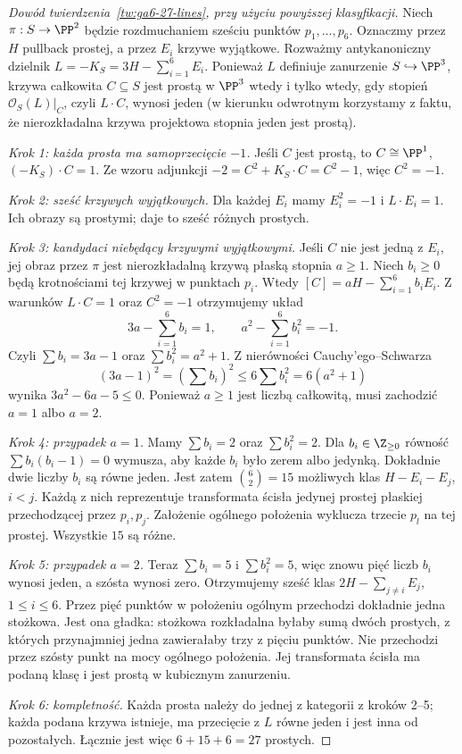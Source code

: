 \begin{proof}[Dowód twierdzenia~\ref{tw:ga6-27-lines}, przy użyciu powyższej klasyfikacji]
Niech $\pi:S\to\PP^2$ będzie rozdmuchaniem
sześciu punktów $p_1,\ldots,p_6$. Oznaczmy
przez $H$ pullback prostej, a przez $E_i$
krzywe wyjątkowe. Rozważmy antykanoniczny
dzielnik $L=-K_S=3H-\sum_{i=1}^6E_i$.
Ponieważ $L$ definiuje zanurzenie $S\hookrightarrow\PP^3$,
krzywa całkowita $C\subseteq S$ jest prostą
w $\PP^3$ wtedy i tylko wtedy, gdy stopień
$\mathcal O_S(L)|_C$, czyli $L\cdot C$, wynosi jeden
(w kierunku odwrotnym korzystamy z faktu, że
nierozkładalna krzywa projektowa stopnia jeden
jest prostą).

\emph{Krok 1: każda prosta ma samoprzecięcie $-1$.}
Jeśli $C$ jest prostą, to $C\cong\PP^1$,
$(-K_S)\cdot C=1$. Ze wzoru adjunkcji
$-2=C^2+K_S\cdot C=C^2-1$, więc $C^2=-1$.

\emph{Krok 2: sześć krzywych wyjątkowych.}
Dla każdej $E_i$ mamy $E_i^2=-1$ i
$L\cdot E_i=1$. Ich obrazy są prostymi;
daje to sześć różnych prostych.

\emph{Krok 3: kandydaci niebędący krzywymi wyjątkowymi.}
Jeśli $C$ nie jest jedną z $E_i$, jej obraz przez
$\pi$ jest nierozkładalną krzywą płaską stopnia
$a\ge1$. Niech $b_i\ge0$ będą krotnościami
tej krzywej w punktach $p_i$. Wtedy
$[C]=aH-\sum_{i=1}^6b_iE_i$. Z warunków
$L\cdot C=1$ oraz $C^2=-1$ otrzymujemy układ
\[
 3a-\sum_{i=1}^6b_i=1,\qquad
 a^2-\sum_{i=1}^6b_i^2=-1.
\]
Czyli $\sum b_i=3a-1$ oraz
$\sum b_i^2=a^2+1$. Z nierówności Cauchy'ego--Schwarza
\[
 (3a-1)^2=\left(\sum b_i\right)^2
 \le6\sum b_i^2=6(a^2+1)
\]
wynika $3a^2-6a-5\le0$. Ponieważ $a\ge1$
jest liczbą całkowitą, musi zachodzić $a=1$ albo $a=2$.

\emph{Krok 4: przypadek $a=1$.}
Mamy $\sum b_i=2$ oraz $\sum b_i^2=2$.
Dla $b_i\in\Z_{\ge0}$ równość
$\sum b_i(b_i-1)=0$ wymusza, aby każde
$b_i$ było zerem albo jedynką. Dokładnie dwie
liczby $b_i$ są równe jeden. Jest zatem
$\binom{6}{2}=15$ możliwych klas
$H-E_i-E_j$, $i<j$. Każdą z nich reprezentuje
transformata ścisła jedynej prostej płaskiej
przechodzącej przez $p_i,p_j$. Założenie
ogólnego położenia wyklucza trzecie $p_l$
na tej prostej. Wszystkie $15$ są różne.

\emph{Krok 5: przypadek $a=2$.}
Teraz $\sum b_i=5$ i $\sum b_i^2=5$,
więc znowu pięć liczb $b_i$ wynosi jeden,
a szósta wynosi zero. Otrzymujemy sześć klas
$2H-\sum_{j\ne i}E_j$, $1\le i\le6$.
Przez pięć punktów w położeniu ogólnym przechodzi
dokładnie jedna stożkowa. Jest ona gładka:
stożkowa rozkładalna byłaby sumą dwóch prostych,
z których przynajmniej jedna zawierałaby trzy
z pięciu punktów. Nie przechodzi przez szósty
punkt na mocy ogólnego położenia. Jej transformata
ścisła ma podaną klasę i jest prostą w kubicznym
zanurzeniu.

\emph{Krok 6: kompletność.}
Każda prosta należy do jednej z kategorii z
kroków 2--5; każda podana krzywa istnieje,
ma przecięcie z $L$ równe jeden i jest inna
od pozostałych. Łącznie jest więc
$6+15+6=27$ prostych.
\end{proof}

